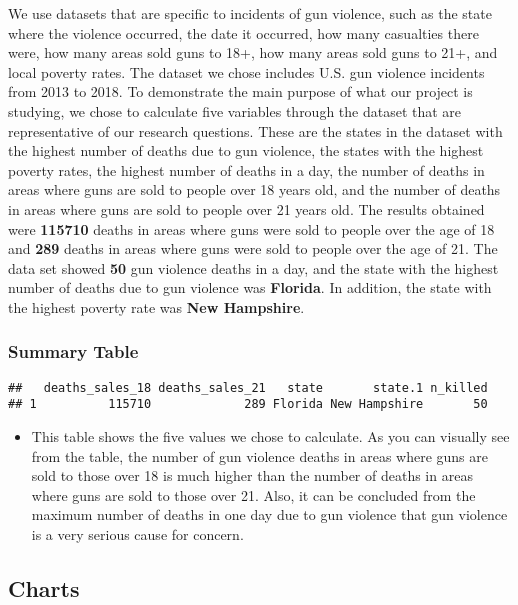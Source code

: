\documentclass[
]{article}
\providecommand{\tightlist}{%
  \setlength{\itemsep}{0pt}\setlength{\parskip}{0pt}}
\begin{document}
We use datasets that are specific to incidents of gun violence, such as
the state where the violence occurred, the date it occurred, how many
casualties there were, how many areas sold guns to 18+, how many areas
sold guns to 21+, and local poverty rates. The dataset we chose includes
U.S. gun violence incidents from 2013 to 2018. To demonstrate the main
purpose of what our project is studying, we chose to calculate five
variables through the dataset that are representative of our research
questions. These are the states in the dataset with the highest number
of deaths due to gun violence, the states with the highest poverty
rates, the highest number of deaths in a day, the number of deaths in
areas where guns are sold to people over 18 years old, and the number of
deaths in areas where guns are sold to people over 21 years old. The
results obtained were \textbf{115710} deaths in areas where guns were
sold to people over the age of 18 and \textbf{289} deaths in areas where
guns were sold to people over the age of 21. The data set showed
\textbf{50} gun violence deaths in a day, and the state with the highest
number of deaths due to gun violence was \textbf{Florida}. In addition,
the state with the highest poverty rate was \textbf{New Hampshire}.

\hypertarget{summary-table}{%
\subsubsection{Summary Table}\label{summary-table}}

\begin{verbatim}
##   deaths_sales_18 deaths_sales_21   state       state.1 n_killed
## 1          115710             289 Florida New Hampshire       50
\end{verbatim}

\begin{itemize}
\tightlist
\item
  This table shows the five values we chose to calculate. As you can
  visually see from the table, the number of gun violence deaths in
  areas where guns are sold to those over 18 is much higher than the
  number of deaths in areas where guns are sold to those over 21. Also,
  it can be concluded from the maximum number of deaths in one day due
  to gun violence that gun violence is a very serious cause for concern.
\end{itemize}

\hypertarget{charts}{%
\subsection{Charts}\label{charts}}
\end{document}
